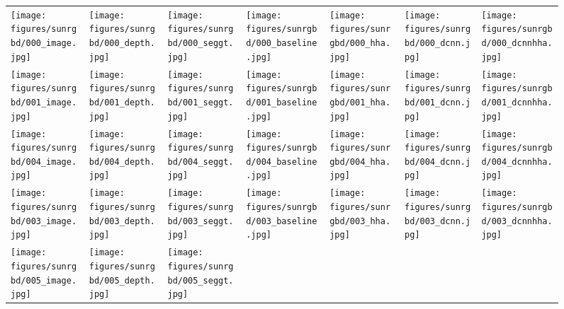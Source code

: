 \begin{figure}[tb]
	\centering
{}
	\begin{tabular}{CCCCCCC}
		\texttt{[image: figures/sunrgbd/000\_image.jpg]}
		&\texttt{[image: figures/sunrgbd/000\_depth.jpg]}
		&\texttt{[image: figures/sunrgbd/000\_seggt.jpg]}
		&\texttt{[image: figures/sunrgbd/000\_baseline.jpg]}
		&\texttt{[image: figures/sunrgbd/000\_hha.jpg]}
		&\texttt{[image: figures/sunrgbd/000\_dcnn.jpg]}
		&\texttt{[image: figures/sunrgbd/000\_dcnnhha.jpg]}
		\\
		\texttt{[image: figures/sunrgbd/001\_image.jpg]}
		&\texttt{[image: figures/sunrgbd/001\_depth.jpg]}
		&\texttt{[image: figures/sunrgbd/001\_seggt.jpg]}
		&\texttt{[image: figures/sunrgbd/001\_baseline.jpg]}
		&\texttt{[image: figures/sunrgbd/001\_hha.jpg]}
		&\texttt{[image: figures/sunrgbd/001\_dcnn.jpg]}
		&\texttt{[image: figures/sunrgbd/001\_dcnnhha.jpg]}
		\\
		\texttt{[image: figures/sunrgbd/004\_image.jpg]}
		&\texttt{[image: figures/sunrgbd/004\_depth.jpg]}
		&\texttt{[image: figures/sunrgbd/004\_seggt.jpg]}
		&\texttt{[image: figures/sunrgbd/004\_baseline.jpg]}
		&\texttt{[image: figures/sunrgbd/004\_hha.jpg]}
		&\texttt{[image: figures/sunrgbd/004\_dcnn.jpg]}
		&\texttt{[image: figures/sunrgbd/004\_dcnnhha.jpg]}
		\\
		\texttt{[image: figures/sunrgbd/003\_image.jpg]}
		&\texttt{[image: figures/sunrgbd/003\_depth.jpg]}
		&\texttt{[image: figures/sunrgbd/003\_seggt.jpg]}
		&\texttt{[image: figures/sunrgbd/003\_baseline.jpg]}
		&\texttt{[image: figures/sunrgbd/003\_hha.jpg]}
		&\texttt{[image: figures/sunrgbd/003\_dcnn.jpg]}
		&\texttt{[image: figures/sunrgbd/003\_dcnnhha.jpg]}
		\\
		\texttt{[image: figures/sunrgbd/005\_image.jpg]}
		&\texttt{[image: figures/sunrgbd/005\_depth.jpg]}
		&\texttt{[image: figures/sunrgbd/005\_seggt.jpg]}

\end{tabular}
\end{figure}
